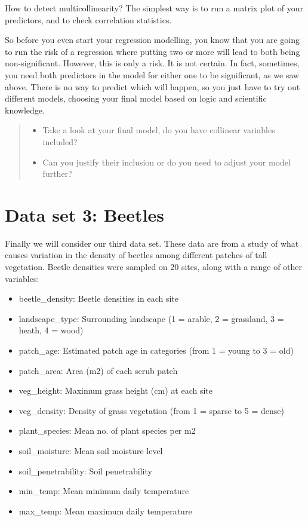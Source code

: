 \documentclass[
]{book}
\providecommand{\tightlist}{%
  \setlength{\itemsep}{0pt}\setlength{\parskip}{0pt}}
\begin{document}
How to detect multicollinearity? The simplest way is to run a matrix plot of your predictors, and to check correlation statistics.

So before you even start your regression modelling, you know that you are going to run the risk of a regression where putting two or more will lead to both being non-significant. However, this is only a risk. It is not certain. In fact, sometimes, you need both predictors in the model for either one to be significant, as we saw above. There is no way to predict which will happen, so you just have to try out different models, choosing your final model based on logic and scientific knowledge.

\begin{quote}
\begin{itemize}
\tightlist
\item
  Take a look at your final model, do you have collinear variables included?
\item
  Can you justify their inclusion or do you need to adjust your model further?
\end{itemize}
\end{quote}

\hypertarget{data-set-3-beetles}{%
\section{Data set 3: Beetles}\label{data-set-3-beetles}}

Finally we will consider our third data set. These data are from a study of what causes variation in the density of beetles among different patches of tall vegetation. Beetle densities were sampled on 20 sites, along with a range of other variables:

\begin{itemize}
\tightlist
\item
  beetle\_density: Beetle densities in each site
\item
  landscape\_type: Surrounding landscape (1 = arable, 2 = grassland, 3 = heath, 4 = wood)
\item
  patch\_age: Estimated patch age in categories (from 1 = young to 3 = old)
\item
  patch\_area: Area (m2) of each scrub patch
\item
  veg\_height: Maximum grass height (cm) at each site
\item
  veg\_density: Density of grass vegetation (from 1 = sparse to 5 = dense)
\item
  plant\_species: Mean no. of plant species per m2
\item
  soil\_moisture: Mean soil moisture level
\item
  soil\_penetrability: Soil penetrability
\item
  min\_temp: Mean minimum daily temperature
\item
  max\_temp: Mean maximum daily temperature
\end{itemize}
\end{document}
